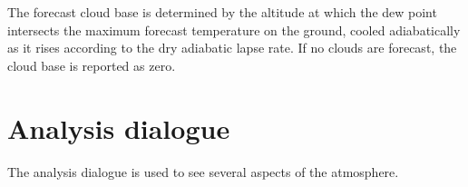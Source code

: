 %

The forecast cloud base is determined by the altitude at which the dew
point intersects the maximum forecast temperature on the ground,
cooled adiabatically as it rises according to the dry adiabatic lapse
rate.  If no clouds are forecast, the cloud base is reported as zero.


\section{Analysis dialogue}

The analysis dialogue is used to see several aspects of the atmosphere.

